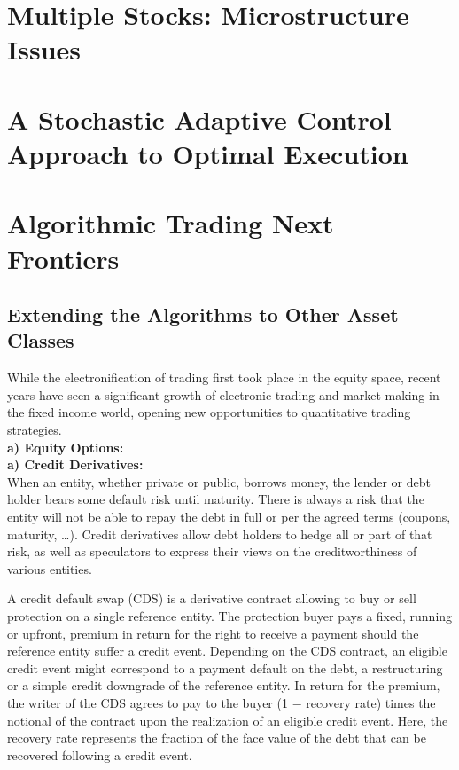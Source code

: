 \section{Multiple Stocks: Microstructure Issues}
\section{A Stochastic Adaptive Control Approach to Optimal Execution}
\section{Algorithmic Trading Next Frontiers}
\subsection{Extending the Algorithms to Other Asset Classes}

While the electronification of trading first took place in the equity space, recent years have seen a significant growth of electronic trading and market making in the fixed income world, opening new opportunities to quantitative trading strategies. \\

\noindent\textbf{a) Equity Options:} \\

\noindent\textbf{a) Credit Derivatives:} \\

When an entity, whether private or public, borrows money, the lender or debt holder bears some default risk until maturity. There is always a risk that the entity will not be able to repay the debt in full or per the agreed terms (coupons, maturity, \dots). Credit derivatives allow debt holders to hedge all or part of that risk, as well as speculators to express their views on the creditworthiness of various entities. 


A credit default swap (CDS) is a derivative contract allowing to buy or sell protection on a single reference entity. The protection buyer pays a fixed, running or upfront, premium in return for the right to receive a payment should the reference entity suffer a credit event. Depending on the CDS contract, an eligible credit event might correspond to a payment default on the debt, a restructuring or a simple credit downgrade of the reference entity. In return for the premium, the writer of the CDS agrees to pay to the buyer (1 $-$ recovery rate) times the notional of the contract upon the realization of an eligible credit event. Here, the recovery rate represents the fraction of the face value of the debt that can be recovered following a credit event.


